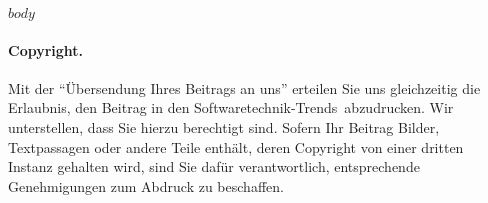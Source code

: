 \documentclass[
    $if(classoption)$
    $for(classoption)$$classoption$$sep$,$endfor$
    $endif$
]{$documentclass$}
\newcommand{\stt}{Soft\-ware\-tech\-nik-Trends}
\begin{document}


    $body$

\paragraph{Copyright.}

Mit der "`\"Ubersendung Ihres Beitrags an uns"' erteilen Sie uns gleichzeitig die Erlaubnis, den Beitrag in den \stt\ abzudrucken. Wir unterstellen, dass Sie hierzu berechtigt sind. Sofern Ihr Beitrag Bilder, Textpassagen oder andere Teile enthält, deren Copyright von einer dritten Instanz gehalten wird, sind Sie dafür verantwortlich, entsprechende Genehmigungen zum Abdruck zu beschaffen.


\printbibliography
\end{document}
